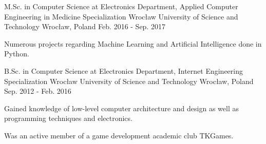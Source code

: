 


\begin{cventries}

  \cventry
    {M.Sc. in Computer Science at Electronics Department, Applied Computer Engineering in Medicine Specialization}
    {Wrocław University of Science and Technology}
    {Wrocław, Poland}
    {Feb. 2016 - Sep. 2017}
    {
      \begin{cvitems}
        \item {Numerous projects regarding Machine Learning and Artificial Intelligence done in Python.}
      \end{cvitems}
    }

  \cventry
    {B.Sc. in Computer Science at Electronics Department, Internet Engineering Specialization}
    {Wrocław University of Science and Technology}
    {Wrocław, Poland}
    {Sep. 2012 - Feb. 2016}
    {
      \begin{cvitems}
        \item {Gained knowledge of low-level computer architecture and design as well as programming techniques and electronics.}
        \item {Was an active member of a game development academic club TKGames.}
      \end{cvitems}
    }

\end{cventries}
